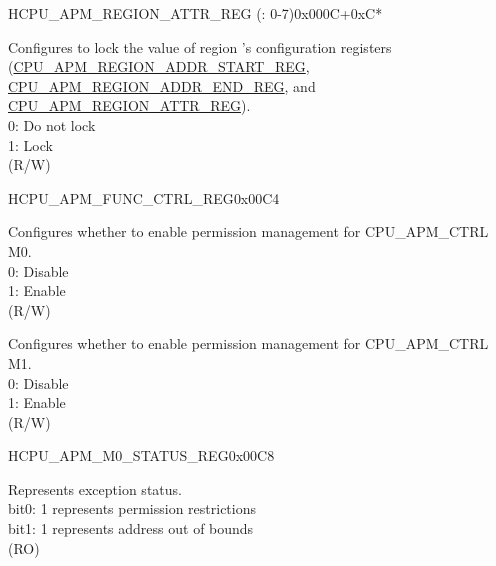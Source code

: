 \begin{register}{H}{CPU\_APM\_REGION\_ATTR\_REG (: 0-7)}{0x000C+0xC*}
\begin{regdesc}
\begin{reglist}
\label{fielddesc:CPUAPMREGIONNLOCK}\item [CPU\_APM\_REGION\regindex{n}\_LOCK] Configures to lock the value of region 's configuration registers (\hyperref[regdesc:CPUAPMREGIONNADDRSTARTREG]{CPU\_APM\_REGION\_ADDR\_START\_REG}, \hyperref[regdesc:CPUAPMREGIONNADDRENDREG]{CPU\_APM\_REGION\_ADDR\_END\_REG}, and \hyperref[regdesc:CPUAPMREGIONNATTRREG]{CPU\_APM\_REGION\_ATTR\_REG}).\\ 
0: Do not lock \\ 
1: Lock  \\ (R/W)
\end{reglist}\end{regdesc}
\end{register}


\begin{register}{H}{CPU\_APM\_FUNC\_CTRL\_REG}{0x00C4}\label{regdesc:CPUAPMFUNCCTRLREG}
%
%
%
\regnewline%
\begin{regdesc}\begin{reglist}
\label{fielddesc:CPUAPMM0FUNCEN}\item [CPU\_APM\_M0\_FUNC\_EN] Configures whether to enable permission management for CPU\_APM\_CTRL M0.\\
0: Disable\\
1: Enable\\
(R/W)
\label{fielddesc:CPUAPMM1FUNCEN}\item [CPU\_APM\_M1\_FUNC\_EN] Configures whether to enable permission management for CPU\_APM\_CTRL M1.\\
0: Disable\\
1: Enable\\
(R/W)
\end{reglist}\end{regdesc}
\end{register}


\begin{register}{H}{CPU\_APM\_M0\_STATUS\_REG}{0x00C8}\label{regdesc:CPUAPMM0STATUSREG}
%
%
\regnewline%
\begin{regdesc}\begin{reglist}
\label{fielddesc:CPUAPMM0EXCEPTIONSTATUS}\item [CPU\_APM\_M0\_EXCEPTION\_STATUS] Represents exception status.\\ 
bit0: 1 represents permission restrictions \\ 
bit1: 1 represents address out of bounds  \\ 
(RO)
\end{reglist}\end{regdesc}
\end{register}


